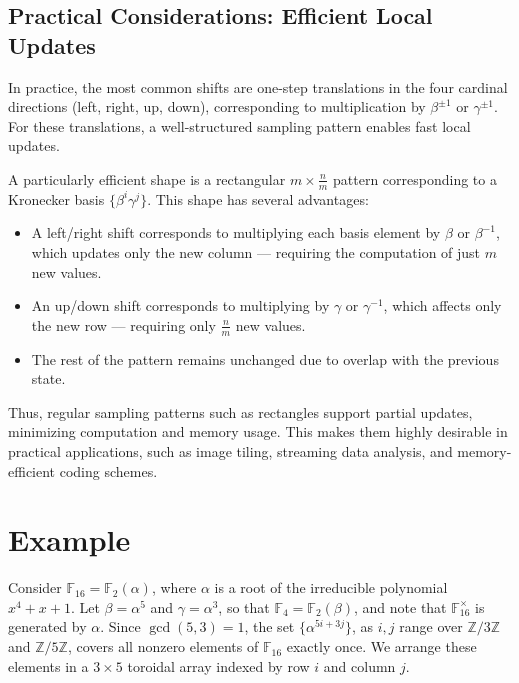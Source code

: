 \documentclass{article}
\begin{document}
\subsection{Practical Considerations: Efficient Local Updates}\label{eff-update}

In practice, the most common shifts are one-step translations in the four cardinal directions (left, right, up, down), corresponding to multiplication by \( \beta^{\pm 1} \) or \( \gamma^{\pm 1} \). For these translations, a well-structured sampling pattern enables fast local updates.

A particularly efficient shape is a rectangular \( m \times \frac{n}{m} \) pattern corresponding to a Kronecker basis \( \{ \beta^i \gamma^j \} \). This shape has several advantages:
\begin{itemize}
\item A left/right shift corresponds to multiplying each basis element by \( \beta \) or \( \beta^{-1} \), which updates only the new column — requiring the computation of just \( m \) new values.
\item An up/down shift corresponds to multiplying by \( \gamma \) or \( \gamma^{-1} \), which affects only the new row — requiring only \( \frac{n}{m} \) new values.
\item The rest of the pattern remains unchanged due to overlap with the previous state.
\end{itemize}



Thus, regular sampling patterns such as rectangles support partial updates, minimizing computation and memory usage. This makes them highly desirable in practical applications, such as image tiling, streaming data analysis, and memory-efficient coding schemes.





\section{Example}\label{examples}

Consider \( \mathbb{F}_{16} = \mathbb{F}_2(\alpha) \), where \( \alpha \) is a root of the irreducible polynomial \( x^4 + x + 1 \). Let \( \beta = \alpha^5 \) and \( \gamma = \alpha^3 \), so that \( \mathbb{F}_4 = \mathbb{F}_2(\beta) \), and note that \( \mathbb{F}_{16}^\times \) is generated by \( \alpha \). Since \( \gcd(5,3) = 1 \), the set \( \{ \alpha^{5i + 3j} \} \), as \( i,j \) range over \( \mathbb{Z}/3\mathbb{Z} \) and \( \mathbb{Z}/5\mathbb{Z} \), covers all nonzero elements of \( \mathbb{F}_{16} \) exactly once. We arrange these elements in a \( 3 \times 5 \) toroidal array indexed by row \( i \) and column \( j \).
\end{document}
